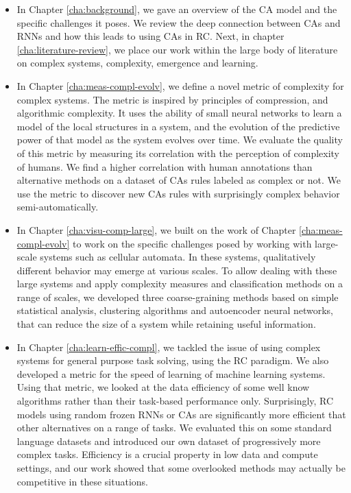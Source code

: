 \begin{itemize}
  \item In Chapter \ref{cha:background}, we gave an overview of the \acf{CA}
        model and the specific challenges it poses. We review the deep
        connection between \acp{CA} and \acfp{RNN} and how this leads to using
        \acp{CA} in \acf{RC}. Next, in chapter \ref{cha:literature-review}, we
        place our work within the large body of literature on complex systems,
        complexity, emergence and learning.

  \item In Chapter \ref{cha:meas-compl-evolv}, we define a novel metric of
        complexity for complex systems. The metric is inspired by principles of
        compression, and algorithmic complexity. It uses the ability of small
        neural networks to learn a model of the local structures in a system,
        and the evolution of the predictive power of that model as the system
        evolves over time. We evaluate the quality of this metric by measuring
        its correlation with the perception of complexity of humans. We find a
        higher correlation with human annotations than alternative methods on a
        dataset of \acp{CA} rules labeled as complex or not. We use the metric
        to discover new \acp{CA} rules with surprisingly complex behavior
        semi-automatically.

  \item In Chapter \ref{cha:visu-comp-large}, we built on the work of Chapter
        \ref{cha:meas-compl-evolv} to work on the specific challenges posed by
        working with large-scale systems such as cellular automata. In these
        systems, qualitatively different behavior may emerge at various scales.
        To allow dealing with these large systems and apply complexity measures
        and classification methods on a range of scales, we developed three
        coarse-graining methods based on simple statistical analysis, clustering
        algorithms and autoencoder neural networks, that can reduce the size of
        a system while retaining useful information.

  \item In Chapter \ref{cha:learn-effic-compl}, we tackled the issue of using
        complex systems for general purpose task solving, using the \ac{RC}
        paradigm. We also developed a metric for the speed of learning of
        machine learning systems. Using that metric, we looked at the data
        efficiency of some well know algorithms rather than their task-based
        performance only. Surprisingly, \ac{RC} models using random frozen
        \acp{RNN} or \acp{CA} are significantly more efficient that other
        alternatives on a range of tasks. We evaluated this on some standard
        language datasets and introduced our own dataset of progressively more
        complex tasks. Efficiency is a crucial property in low data and compute
        settings, and our work showed that some overlooked methods may actually
        be competitive in these situations.
\end{itemize}

